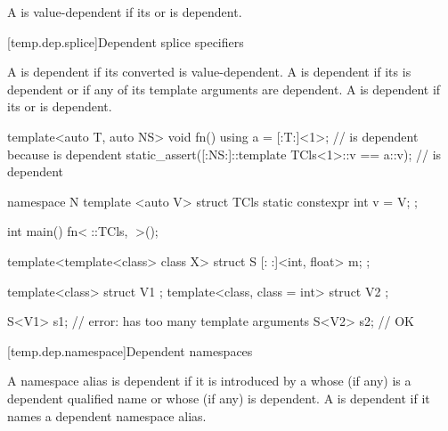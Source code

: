 \pnum
A  is value-dependent
if its  or
is dependent.

[temp.dep.splice]{Dependent splice specifiers}

\pnum
A  is dependent
if its converted  is value-dependent.
A  is dependent
if its  is dependent or
if any of its template arguments are dependent.
A  is dependent
if its  or
 is dependent.

\pnum
\begin{example}
\begin{codeblock}
template<auto T, auto NS>
void fn() {
  using a = [:T:]<1>;                           //  is dependent because \tcode{[:T:]} is dependent
  static_assert([:NS:]::template TCls<1>::v == a::v);   // \tcode{[:NS:]} is dependent
}

namespace N {
  template <auto V> struct TCls { static constexpr int v = V; };
}

int main() {
  fn<^^N::TCls, ^^N>();
}
\end{codeblock}
\end{example}

\pnum
\begin{example}
\begin{codeblock}
template<template<class> class X>
struct S {
  [:^^X:]<int, float> m;
};

template<class> struct V1 {};
template<class, class = int> struct V2 {};

S<V1> s1;                       // error:  has too many template arguments
S<V2> s2;                       // OK
\end{codeblock}
\end{example}

[temp.dep.namespace]{Dependent namespaces}

\pnum
A namespace alias is dependent
if it is introduced by a 
whose  (if any) is
a dependent qualified name or
whose  (if any) is dependent.
A  is dependent
if it names a dependent namespace alias.

